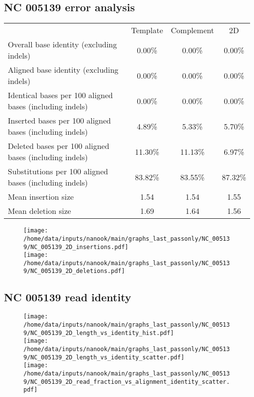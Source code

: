 \documentclass[a4paper,11pt,oneside]{article}
\begin{document}
\subsection*{NC 005139 error analysis}
\vspace{-3mm}
\begin{table}[H]
{\footnotesize
\fontsize{9pt}{11pt}\selectfont
\begin{tabular}{l c c c}
 & Template & Complement & 2D \\
Overall base identity (excluding indels) & 0.00\% & 0.00\% & 0.00\% \\
Aligned base identity (excluding indels) & 0.00\% & 0.00\% & 0.00\% \\
Identical bases per 100 aligned bases (including indels) & 0.00\% & 0.00\% & 0.00\% \\
Inserted bases per 100 aligned bases (including indels) & 4.89\% & 5.33\% & 5.70\% \\
Deleted bases per 100 aligned bases (including indels) & 11.30\% & 11.13\% & 6.97\% \\
Substitutions per 100 aligned bases (including indels) & 83.82\% & 83.55\% & 87.32\% \\
Mean insertion size & 1.54 & 1.54 & 1.55 \\
Mean deletion size & 1.69 & 1.64 & 1.56 \\
\end{tabular}
}
\end{table}
\vspace{-5mm}
\begin{figure}[H]
\centering
  \texttt{[image: /home/data/inputs/nanook/main/graphs\_last\_passonly/NC\_005139/NC\_005139\_2D\_insertions.pdf]} \\
  \texttt{[image: /home/data/inputs/nanook/main/graphs\_last\_passonly/NC\_005139/NC\_005139\_2D\_deletions.pdf]}
\end{figure}
\subsection*{NC 005139 read identity}
\vspace{-3mm}
\begin{figure}[H]
\centering
  \texttt{[image: /home/data/inputs/nanook/main/graphs\_last\_passonly/NC\_005139/NC\_005139\_2D\_length\_vs\_identity\_hist.pdf]} \\
  \texttt{[image: /home/data/inputs/nanook/main/graphs\_last\_passonly/NC\_005139/NC\_005139\_2D\_length\_vs\_identity\_scatter.pdf]} \\
  \texttt{[image: /home/data/inputs/nanook/main/graphs\_last\_passonly/NC\_005139/NC\_005139\_2D\_read\_fraction\_vs\_alignment\_identity\_scatter.pdf]}
\end{figure}
\begin{figure}[H]
\centering
   \end{figure}
\end{document}
